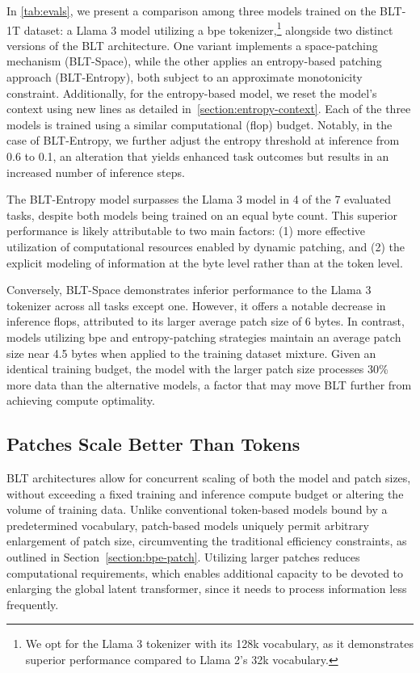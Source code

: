 In \autoref{tab:evals}, we present a comparison among three models trained on the {\textsc BLT}-1T dataset: a Llama 3 model utilizing a bpe tokenizer,\footnote{We opt for the Llama 3 tokenizer with its 128k vocabulary, as it demonstrates superior performance compared to Llama 2's 32k vocabulary.} alongside two distinct versions of the {\textsc BLT} architecture. One variant implements a space-patching mechanism ({\textsc BLT}-Space), while the other applies an entropy-based patching approach ({\textsc BLT}-Entropy), both subject to an approximate monotonicity constraint. Additionally, for the entropy-based model, we reset the model's context using new lines as detailed in~\autoref{section:entropy-context}. Each of the three models is trained using a similar computational (flop) budget. Notably, in the case of {\textsc BLT}-Entropy, we further adjust the entropy threshold at inference from 0.6 to 0.1, an alteration that yields enhanced task outcomes but results in an increased number of inference steps.

The {\textsc BLT}-Entropy model surpasses the Llama 3 model in 4 of the 7 evaluated tasks, despite both models being trained on an equal byte count. This superior performance is likely attributable to two main factors: (1) more effective utilization of computational resources enabled by dynamic patching, and (2) the explicit modeling of information at the byte level rather than at the token level.

Conversely, {\textsc BLT}-Space demonstrates inferior performance to the Llama 3 tokenizer across all tasks except one. However, it offers a notable decrease in inference flops, attributed to its larger average patch size of 6 bytes. In contrast, models utilizing bpe and entropy-patching strategies maintain an average patch size near 4.5 bytes when applied to the training dataset mixture. Given an identical training budget, the model with the larger patch size processes 30\% more data than the alternative models, a factor that may move {\textsc BLT} further from achieving compute optimality.

\subsection{Patches Scale Better Than Tokens} {\textsc BLT} architectures allow for concurrent scaling of both the model and patch sizes, without exceeding a fixed training and inference compute budget or altering the volume of training data. Unlike conventional token-based models bound by a predetermined vocabulary, patch-based models uniquely permit arbitrary enlargement of patch size, circumventing the traditional efficiency constraints, as outlined in Section~\ref{section:bpe-patch}. Utilizing larger patches reduces computational requirements, which enables additional capacity to be devoted to enlarging the global latent transformer, since it needs to process information less frequently.

